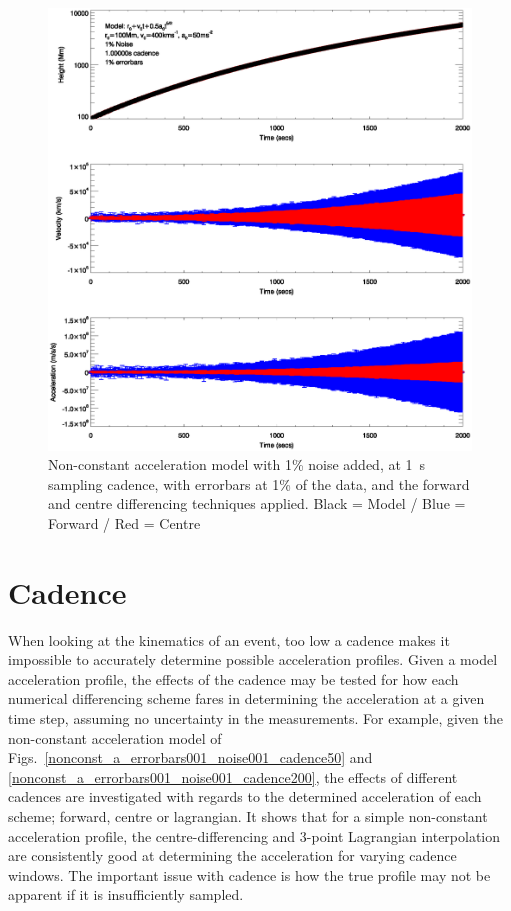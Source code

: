 \documentclass[namedreferences]{SolarPhysics}
\begin{document}
\begin{article}
\begin{figure}
 \centerline{\includegraphics[width=\linewidth]{images/nonconst_a_errorbars001_noise001_cadence1.ps}}
   \caption{Non-constant acceleration model with 1\% noise added, at 1~s sampling cadence, with errorbars at 1\% of the data, and the forward and centre differencing techniques applied. Black = Model / Blue = Forward / Red = Centre}
    \label{nonconst_a_errorbars001_noise001_cadence1}
\end{figure}


\section{Cadence}

When looking at the kinematics of an event, too low a cadence makes it impossible to accurately determine possible acceleration profiles. Given a model acceleration profile, the effects of the cadence may be tested for how each numerical differencing scheme fares in determining the acceleration at a given time step, assuming no uncertainty in the measurements. For example, given the non-constant acceleration model of Figs.~\ref{nonconst_a_errorbars001_noise001_cadence50} and \ref{nonconst_a_errorbars001_noise001_cadence200}, the effects of different cadences are investigated with regards to the determined acceleration of each scheme; forward, centre or lagrangian. It shows that for a simple non-constant acceleration profile, the centre-differencing and 3-point Lagrangian interpolation are consistently good at determining the acceleration for varying cadence windows. The important issue with cadence is how the true profile may not be apparent if it is insufficiently sampled.


\end{article}
\end{document}
